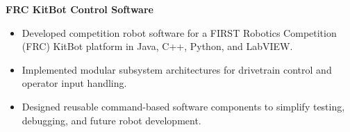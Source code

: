 \textbf{FRC KitBot Control Software}
\begin{itemize}
  \item Developed competition robot software for a FIRST Robotics Competition (FRC) KitBot platform in Java, C++, Python, and LabVIEW.
  \item Implemented modular subsystem architectures for drivetrain control and operator input handling.
  \item Designed reusable command-based software components to simplify testing, debugging, and future robot development.
\end{itemize}